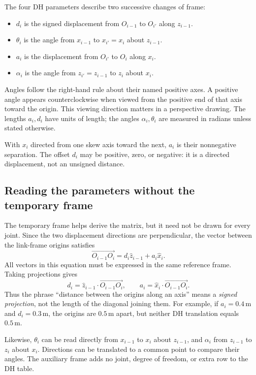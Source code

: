 The four DH parameters describe two successive changes of frame:
\begin{itemize}
\item $d_i$ is the signed displacement from $O_{i-1}$ to $O_{i'}$
      along $z_{i-1}$.
\item $\theta_i$ is the angle from $x_{i-1}$ to $x_{i'}=x_i$
      about $z_{i-1}$.
\item $a_i$ is the displacement from $O_{i'}$ to $O_i$ along $x_i$.
\item $\alpha_i$ is the angle from $z_{i'}=z_{i-1}$ to $z_i$
      about $x_i$.
\end{itemize}
Angles follow the right-hand rule about their named positive axes.
A positive angle appears counterclockwise when viewed from the positive
end of that axis toward the origin. This viewing direction matters in a
perspective drawing. The lengths $a_i,d_i$ have units of length; the
angles $\alpha_i,\theta_i$ are measured in radians unless stated otherwise.

With $x_i$ directed from one skew axis toward the next, $a_i$ is their
nonnegative separation. The offset $d_i$ may be positive, zero, or negative:
it is a directed displacement, not an unsigned distance.

\subsection{Reading the parameters without the temporary frame}
The temporary frame helps derive the matrix, but it need not be drawn for
every joint. Since the two displacement directions are perpendicular,
the vector between the link-frame origins satisfies
\begin{equation}
 \overrightarrow{O_{i-1}O_i}=d_i\hat z_{i-1}+a_i\hat x_i.
 \label{eq:l10-dh-displacement}
\end{equation}
All vectors in this equation must be expressed in the same reference
frame. Taking projections gives
\[
 d_i=\hat z_{i-1}\cdot\overrightarrow{O_{i-1}O_i},\qquad
 a_i=\hat x_i\cdot\overrightarrow{O_{i-1}O_i}.
\]
Thus the phrase ``distance between the origins along an axis'' means a
\emph{signed projection}, not the length of the diagonal joining them.
For example, if $a_i=0.4\,\mathrm m$ and $d_i=0.3\,\mathrm m$, the
origins are $0.5\,\mathrm m$ apart, but neither DH translation equals
$0.5\,\mathrm m$.

Likewise, $\theta_i$ can be read directly from $x_{i-1}$ to $x_i$ about
$z_{i-1}$, and $\alpha_i$ from $z_{i-1}$ to $z_i$ about $x_i$.
Directions can be translated to a common point to compare their angles.
The auxiliary frame adds no joint, degree of freedom, or extra row to the
DH table.

